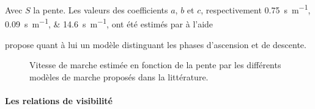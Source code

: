 Avec \(S\) la pente. Les valeurs des coefficients \(a\), \(b\) et
\(c\), respectivement \SIlist{0,75;0,09;14,6}{\second\per\meter}, ont
été estimés par \textcite{Rees2004} à l'aide

\textcite{Kerouanton2020} propose quant à lui un modèle distinguant
les phases d’ascension et de descente.



\begin{figure}
  \centering 
  \caption{Vitesse de marche estimée en fonction de la pente par les
    différents modèles de marche proposés dans la littérature.}
  \label{fig:modeles_marche}
\end{figure}

\paragraph{Les relations de visibilité}



